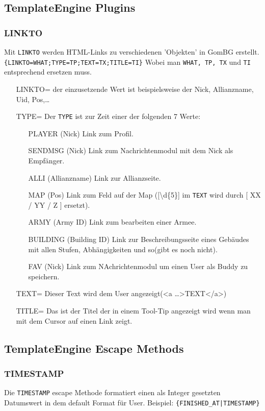 \documentclass[a4paper,10pt]{article}
\begin{document}
\subsection{TemplateEngine Plugins}

\subsubsection{LINKTO}
Mit {\tt LINKTO} werden HTML-Links zu verschiedenen 'Objekten' in GomBG erstellt.\newline
{\tt \{LINKTO=WHAT;TYPE=TP;TEXT=TX;TITLE=TI\}}\newline
Wobei man {\tt WHAT, TP, TX} und {\tt TI} entsprechend ersetzen muss.
\begin{itemize}
	\item[LINKTO=] der einzusetzende Wert ist beispielsweise der Nick, Allianzname, Uid, Pos,\dots
	\item[TYPE=] Der {\tt TYPE} ist zur Zeit einer der folgenden 7 Werte:
	\begin{itemize}
		\item[PLAYER] (Nick) Link zum Profil.
		\item[SENDMSG] (Nick) Link zum Nachrichtenmodul mit dem Nick als Empf\"anger.
		\item[ALLI] (Allianzname) Link zur Allianzseite.
		\item[MAP] (Pos) Link zum Feld auf der Map ([\textbackslash d\{5\}] im {\tt TEXT} wird durch [ XX / YY / Z ] ersetzt).
		\item[ARMY] (Army ID) Link zum bearbeiten einer Armee.
		\item[BUILDING] (Building ID) Link zur Beschreibungsseite eines Geb\"audes mit allen Stufen, Abh\"angigkeiten und so(gibt es noch nicht).
		\item[FAV] (Nick) Link zum NAchrichtenmodul um einen User als Buddy zu speichern.
	\end{itemize}
	\item[TEXT=] Dieser Text wird dem User angezeigt({\textless}a \dots{\textgreater}TEXT{\textless}/a{\textgreater})
	\item[TITLE=] Das ist der Titel der in einem Tool-Tip angezeigt wird wenn man mit dem Cursor auf einen Link zeigt.
\end{itemize}

\subsection{TemplateEngine Escape Methods}

\subsubsection{TIMESTAMP}
Die {\tt TIMESTAMP} escape Methode formatiert einen als Integer gesetzten Datumswert in dem default Format f\"ur User.
Beispiel:\newline
{\tt \{FINISHED\_AT|TIMESTAMP\}}
\end{document}
